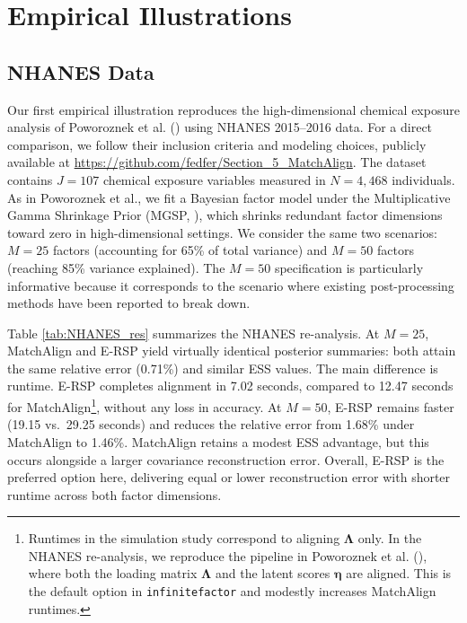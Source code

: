 \documentclass[
  man,
  longtable,
  nolmodern,
  notxfonts,
  notimes,
  colorlinks=true,linkcolor=blue,citecolor=blue,urlcolor=blue]{apa7}
\theoremstyle{plain}
\theoremstyle{plain}
\theoremstyle{remark}
\begin{document}
\section{Empirical Illustrations}\label{empirical-illustrations}

\subsection{NHANES Data}\label{nhanes-data}

Our first empirical illustration reproduces the high-dimensional
chemical exposure analysis of Poworoznek et al.
() using NHANES 2015--2016 data. For
a direct comparison, we follow their inclusion criteria and modeling
choices, publicly available at
\url{https://github.com/fedfer/Section_5_MatchAlign}. The dataset
contains \(J=107\) chemical exposure variables measured in \(N=4,468\)
individuals. As in Poworoznek et al., we fit a Bayesian factor model
under the Multiplicative Gamma Shrinkage Prior (MGSP,
),
which shrinks redundant factor dimensions toward zero in
high-dimensional settings. We consider the same two scenarios: \(M=25\)
factors (accounting for 65\% of total variance) and \(M=50\) factors
(reaching 85\% variance explained). The \(M=50\) specification is
particularly informative because it corresponds to the scenario where
existing post-processing methods have been reported to break down.

Table \ref{tab:NHANES_res} summarizes the NHANES re-analysis. At
\(M=25\), MatchAlign and E-RSP yield virtually identical posterior
summaries: both attain the same relative error (0.71\%) and similar ESS
values. The main difference is runtime. E-RSP completes alignment in
7.02 seconds, compared to 12.47 seconds for MatchAlign\footnote{Runtimes
  in the simulation study correspond to aligning \(\mathbf\Lambda\)
  only. In the NHANES re-analysis, we reproduce the pipeline in
  Poworoznek et al. (), where both
  the loading matrix \(\mathbf\Lambda\) and the latent scores
  \(\boldsymbol\eta\) are aligned. This is the default option in
  \texttt{infinitefactor} and modestly increases MatchAlign runtimes.},
without any loss in accuracy. At \(M=50\), E-RSP remains faster (19.15
vs.~29.25 seconds) and reduces the relative error from 1.68\% under
MatchAlign to 1.46\%. MatchAlign retains a modest ESS advantage, but
this occurs alongside a larger covariance reconstruction error. Overall,
E-RSP is the preferred option here, delivering equal or lower
reconstruction error with shorter runtime across both factor dimensions.
\end{document}

